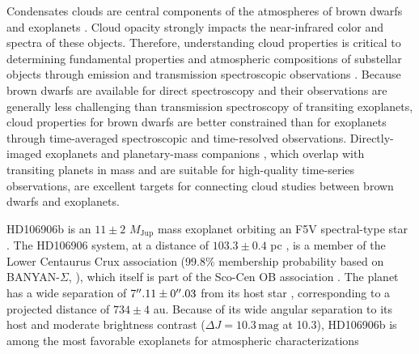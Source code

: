 \documentclass[twocolumn]{aastex62}
\newcommand{\mjup}{\ensuremath{M_\mathrm{Jup}}\xspace}
\begin{document}
Condensates clouds are central components of the atmospheres of brown dwarfs and exoplanets \citep[e.g.,][]{Morley2012,Marley2013,Marley2015}. Cloud opacity strongly impacts the near-infrared color and spectra of these objects. Therefore, understanding cloud properties is critical to determining  fundamental properties and atmospheric compositions of substellar objects through emission and transmission spectroscopic observations \citep{Ingraham2014, Kreidberg2014a, Stevenson2016, DeWit2016, Samland2017}. Because brown dwarfs are available for direct spectroscopy and their observations are generally less challenging than transmission spectroscopy of transiting exoplanets, cloud properties for brown dwarfs are better constrained than for exoplanets through time-averaged spectroscopic \citep[e.g.,][]{Cushing2008,Stephens2009} and {time-resolved} \citep[e.g.,][]{Buenzli2012,Apai2013,Biller2017,Apai2017} observations. Directly-imaged exoplanets and planetary-mass companions \citep[e.g.,][]{Chauvin2004,Marois2008a,Marois2010,Macintosh2015a}, which overlap with transiting planets in mass and are suitable for high-quality time-series observations, are excellent targets for connecting cloud studies between brown dwarfs and exoplanets.

HD106906b is an $11\pm2$ \mjup{}  mass exoplanet orbiting an F5V spectral-type star \citep{Bailey2013}. The HD106906 system, at a distance of $103.3\pm0.4$ pc \citep{Gaia2016,Gaia2018}, is a member of the Lower Centaurus Crux association (99.8\% membership probability based on BANYAN-$\Sigma$, \citealt{Gagne2018} ), which itself is  part of the Sco-Cen OB association \citep[age: $15\pm3$ Myr,][]{Pecaut2016}. The planet has a wide separation of $7\mbox{$^{\prime\prime}$}.11\pm0\mbox{$^{\prime\prime}$}.03$ from its host star \citep{Bailey2013}, corresponding to a projected distance of $734\pm4$ au. Because of its wide angular separation to its host and moderate brightness contrast ($\Delta J=10.3\,\mathrm{mag}$ at 10.3\arcsec), HD106906b is among the most favorable exoplanets for atmospheric characterizations \citep[e.g., ][]{Bailey2013,Kalas2015,Wu2016,Daemgen2017}
\end{document}
